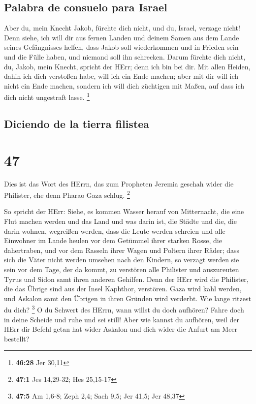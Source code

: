 \hypertarget{palabra-de-consuelo-para-israel}{%
\subsection{Palabra de consuelo para
Israel}\label{palabra-de-consuelo-para-israel}}

 Aber du, mein Knecht Jakob, fürchte dich nicht, und du,
Israel, verzage nicht! Denn siehe, ich will dir aus fernen Landen und
deinem Samen aus dem Lande seines Gefängnisses helfen, dass Jakob soll
wiederkommen und in Frieden sein und die Fülle haben, und niemand soll
ihn schrecken.  Darum fürchte dich nicht, du, Jakob, mein
Knecht, spricht der HErr; denn ich bin bei dir. Mit allen Heiden, dahin
ich dich verstoßen habe, will ich ein Ende machen; aber mit dir will ich
nicht ein Ende machen, sondern ich will dich züchtigen mit Maßen, auf
dass ich dich nicht ungestraft lasse. \footnote{\textbf{46:28} Jer 30,11}

\hypertarget{diciendo-de-la-tierra-filistea}{%
\subsection{Diciendo de la tierra
filistea}\label{diciendo-de-la-tierra-filistea}}

\hypertarget{section-46}{%
\section{47}\label{section-46}}

 Dies ist das Wort des HErrn, das zum Propheten Jeremia
geschah wider die Philister, ehe denn Pharao Gaza schlug. \footnote{\textbf{47:1}
  Jes 14,29-32; Hes 25,15-17}

 So spricht der HErr: Siehe, es kommen Wasser herauf von
Mitternacht, die eine Flut machen werden und das Land und was darin ist,
die Städte und die, die darin wohnen, wegreißen werden, dass die Leute
werden schreien und alle Einwohner im Lande heulen  vor
dem Getümmel ihrer starken Rosse, die dahertraben, und vor dem Rasseln
ihrer Wagen und Poltern ihrer Räder; dass sich die Väter nicht werden
umsehen nach den Kindern, so verzagt werden sie sein  vor
dem Tage, der da kommt, zu verstören alle Philister und auszureuten
Tyrus und Sidon samt ihren anderen Gehilfen. Denn der HErr wird die
Philister, die das Übrige sind aus der Insel Kaphthor, verstören.
 Gaza wird kahl werden, und Askalon samt den Übrigen in
ihren Gründen wird verderbt. Wie lange ritzest du dich? \footnote{\textbf{47:5}
  Am 1,6-8; Zeph 2,4; Sach 9,5; Jer 41,5; Jer 48,37}  O du
Schwert des HErrn, wann willst du doch aufhören? Fahre doch in deine
Scheide und ruhe und sei still!  Aber wie kannst du
aufhören, weil der HErr dir Befehl getan hat wider Askalon und dich
wider die Anfurt am Meer bestellt?

